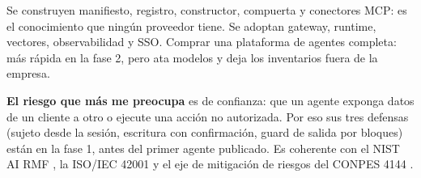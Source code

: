 {Se construyen manifiesto, registro, constructor, compuerta y conectores MCP: es el
conocimiento que ningún proveedor tiene. Se adoptan gateway, runtime, vectores,
observabilidad y SSO.}
{Comprar una plataforma de agentes completa: más rápida en la fase 2, pero ata modelos y deja
los inventarios fuera de la empresa.}

\textbf{El riesgo que más me preocupa} es de confianza: que un agente exponga datos de un cliente
a otro o ejecute una acción no autorizada. Por eso sus tres defensas (sujeto desde la sesión,
escritura con confirmación, guard de salida por bloques) están en la fase 1, antes del primer
agente publicado. Es coherente con el NIST AI RMF \citep{nist2023rmf}, la ISO/IEC 42001
\citep{iso42001} y el eje de mitigación de riesgos del CONPES 4144 \citep{conpes4144}.
